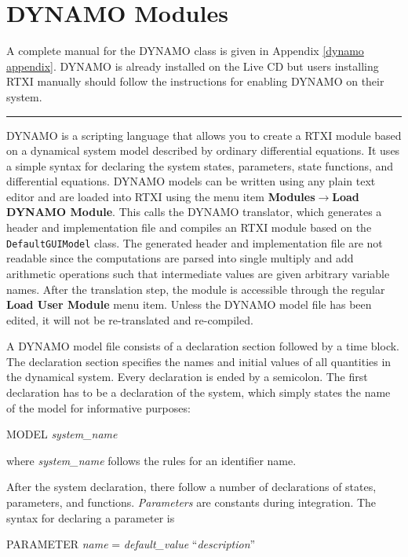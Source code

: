 \section{DYNAMO Modules}
\label{dynamomodules}
A complete manual for the DYNAMO class is given in Appendix \ref{dynamo appendix}.
\attention {} DYNAMO is already installed on the Live CD but users installing RTXI manually should follow the instructions for enabling DYNAMO on their system. \vspace{.5cm}
\hrule
\vspace{.5cm}
DYNAMO is a scripting language that allows you to create a RTXI module based on a dynamical system model described by ordinary differential equations. It uses a simple syntax for declaring the system states, parameters, state functions, and differential equations. DYNAMO models can be written using any plain text editor and are loaded into RTXI using the menu item \textbf{Modules}$\rightarrow$\textbf{Load DYNAMO Module}. This calls the DYNAMO translator, which generates a \cpp  header and implementation file and compiles an RTXI module based on the \texttt{DefaultGUIModel} class. The generated header and implementation file are not readable since the computations are parsed into single multiply and add arithmetic operations such that intermediate values are given arbitrary variable names. After the translation step, the module is accessible through the regular \textbf{Load User Module} menu item. Unless the DYNAMO model file has been edited, it will not be re-translated and re-compiled.

A DYNAMO model file consists of a declaration section followed by a time block. The declaration section specifies the names and initial values of all quantities in the dynamical system. Every declaration is ended by a semicolon. The first declaration has to be a declaration of the system, which simply states the name of the model for informative purposes:

\begin{example}
  MODEL \emph{system\_name}
\end{example}

where \emph{system\_name} follows the rules for an identifier name.

After the system declaration, there follow a number of declarations of states, parameters, and functions. \emph{Parameters} are constants during integration. The syntax for declaring a parameter is
\begin{example}
        PARAMETER \emph{name} = \emph{default\_value} ``\emph{description}''
\end{example}

